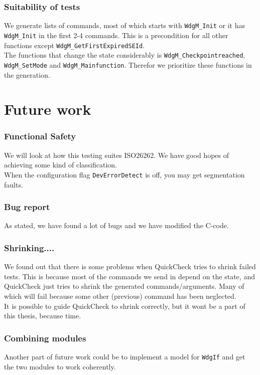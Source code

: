 \documentclass{beamer}
\begin{document}
\begin{frame}[fragile]
  \frametitle{Suitability of tests}
  We generate lists of commands, most of which starts with
  \verb!WdgM_Init! or it has \verb!WdgM_Init! in the first 2-4
  commands. This is a precondition for all other functions except
  \verb!WdgM_GetFirstExpiredSEId!.\\[0.5cm]

  The functions that change the state considerably is
  \verb!WdgM_Checkpointreached!, \verb!WdgM_SetMode! and
  \verb!WdgM_Mainfunction!.  Therefor we prioritize these functions in
  the generation.
\end{frame}

\section{Future work}

\begin{frame}[fragile]
  \frametitle{Functional Safety}
  We will look at how this testing suites ISO26262. We have good hopes of
  achieving some kind of classification.\\[0.5cm]

  When the configuration flag \verb!DevErrorDetect! is off, you may get
  segmentation faults.
\end{frame}

\begin{frame}
  \frametitle{Bug report}
  As stated, we have found a lot of bugs and we have modified the C-code.
\end{frame}

\begin{frame}
  \frametitle{Shrinking....}
  We found out that there is some problems when QuickCheck tries to
  shrink failed tests. This is because most of the commands we send in
  depend on the state, and QuickCheck just tries to shrink the generated
  commands/arguments. Many of which will fail because some other
  (previous) command has been neglected.\\[0.5cm]

  It is possible to guide QuickCheck to shrink correctly, but it wont
  be a part of this thesis, because time.
\end{frame}

\begin{frame}[fragile]
  \frametitle{Combining modules}
  Another part of future work could be to implement a model for
  \verb!WdgIf! and get the two modules to work coherently.
\end{frame}
\end{document}
